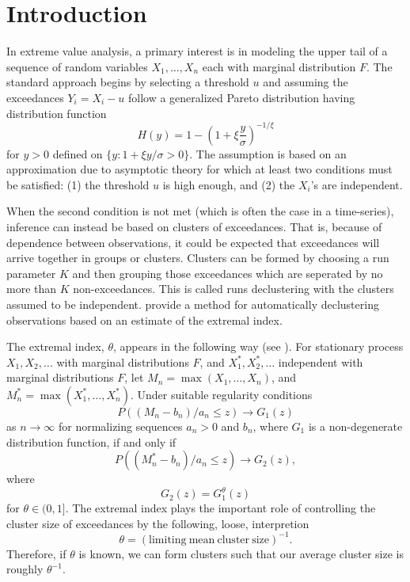 \section{Introduction}
\label{intro}

In extreme value analysis, a primary interest is in modeling the upper tail of a sequence of random variables $X_1,\ldots,X_n$ each with marginal distribution $F$. The standard approach begins by selecting a threshold $u$ and assuming the exceedances $Y_i=X_i-u$ follow a generalized Pareto distribution having distribution function
\[ H(y) = 1 - \left(1 + \xi \frac{y}{\sigma}\right)^{-1/\xi} \]
for $y>0$ defined on $\{y:1+\xi y/\sigma>0\}$. The assumption is based on an approximation due to asymptotic theory for which at least two conditions must be satisfied: (1) the threshold $u$ is high enough, and (2) the $X_i$'s are independent.

When the second condition is not met (which is often the case in a time-series), inference can instead be based on clusters of exceedances. That is, because of dependence between observations, it could be expected that exceedances will arrive together in groups or clusters. Clusters can be formed by choosing a run parameter $K$ and then grouping those exceedances which are seperated by no more than $K$ non-exceedances. This is called runs declustering with the clusters assumed to be independent. \cite{ferro2003inference} provide a method for automatically declustering observations based on an estimate of the extremal index.

The extremal index, $\theta$, appears in the following way (see \cite{coles2001introduction}). For stationary process $X_1,X_2,\ldots$ with marginal distributions $F$, and $X_1^*,X_2^*,\ldots$ independent with marginal distributions $F$, let $M_n=\max(X_1,\ldots,X_n)$, and $M_n^*=\max(X_1^*,\ldots,X_n^*)$. Under suitable regularity conditions
\[ P((M_n-b_n)/a_n \leq z) \rightarrow G_1(z) \]
as $n\rightarrow\infty$ for normalizing sequences $a_n>0$ and $b_n$, where $G_1$ is a non-degenerate distribution function, if and only if
\[ P((M_n^*-b_n)/a_n \leq z) \rightarrow G_2(z),\]
where
\[ G_2(z)=G_1^\theta(z) \]
for $\theta\in(0,1]$. The extremal index plays the important role of controlling the cluster size of exceedances by the following, loose, interpretion
\[ \theta = (\mathrm{limiting~mean~cluster~size})^{-1}. \]
Therefore, if $\theta$ is known, we can form clusters such that our average cluster size is roughly $\theta^{-1}$.

